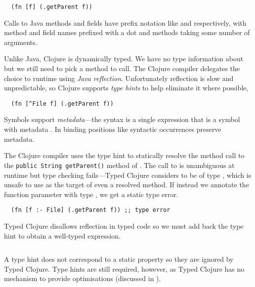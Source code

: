 \begin{verbatim}
  (fn [f] (.getParent f))
\end{verbatim}

Calls to Java methods and fields have prefix notation
like  and  respectively,
with method and field names prefixed with a dot and methods taking some number of arguments.

Unlike Java, Clojure is dynamically typed. We have no type information about 
but we still need to pick a method to call. The Clojure compiler delegates
the choice to runtime using \emph{Java reflection}.
Unfortunately reflection is slow and unpredictable, so Clojure supports \emph{type hints}
to help eliminate it where possible, 

\begin{verbatim}
  (fn [^File f] (.getParent f))
\end{verbatim}

Symbols support \emph{metadata}---the syntax 
is a single expression that is a symbol  with metadata .
In binding positions like 
syntactic occurrences preserve metadata.

The Clojure compiler uses the type hint
to statically resolve 
the method call to the
\texttt{public String getParent()}
method of .
The call to  is unambiguous at runtime but type 
checking fails---Typed Clojure
considers  to be of type , which is unsafe 
to use as the target of even a resolved method.
If instead we annotate the function parameter with type ,
we get a static type error.

\begin{verbatim}
  (fn [f :- File] (.getParent f)) ;; type error
\end{verbatim}

Typed Clojure disallows reflection in typed code
so we must add back the type hint to obtain a well-typed
expression.
\newpage
\begin{exmp}
\inputminted[firstline=10,lastline=10]{clojure}{code/demo/src/demo/parent3.clj}
\end{exmp}
A type hint does not correspond to a static property so they are ignored by Typed Clojure.
Type hints are still required, however, as Typed Clojure has no mechanism to provide
optimisations (discussed in ).

\begin{exmp}
\inputminted[firstline=18,lastline=19]{clojure}{code/demo/src/demo/parent3.clj}
\end{exmp}


